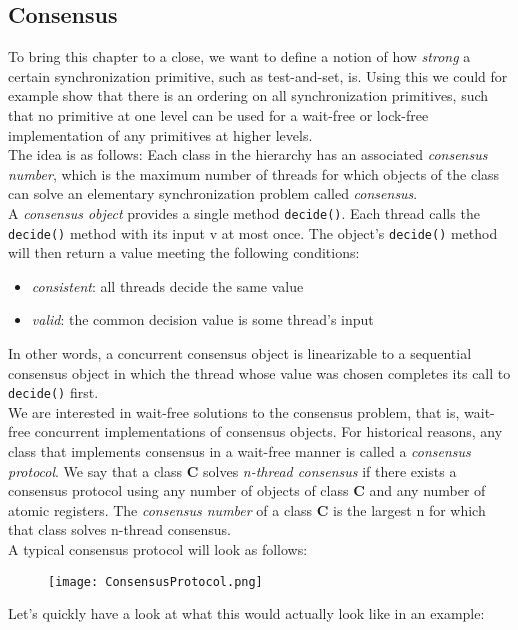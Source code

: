 \documentclass[main]{subfiles}
\begin{document}
\subsection{Consensus}
To bring this chapter to a close, we want to define a notion of how \textit{strong} a certain synchronization primitive, such as test-and-set, is. Using this we could for example show that there is an ordering on all synchronization primitives, such that no primitive at one level can be used for a wait-free or lock-free implementation of any primitives at higher levels. \\[3mm]
The idea is as follows: Each class in the hierarchy has an associated \textit{consensus number}, which is the maximum number of threads for which objects of the class can solve an elementary synchronization problem called \textit{consensus}. \\[3mm]
A \textit{consensus object} provides a single method \texttt{decide()}. Each thread calls the \texttt{decide()} method with its input v at most once. The object's \texttt{decide()} method will then return a value meeting the following conditions:
\begin{itemize}
    \item \textit{consistent}: all threads decide the same value
    \item \textit{valid}: the common decision value is some thread's input
\end{itemize}
In other words, a concurrent consensus object is linearizable to a sequential consensus object in which the thread whose value was chosen completes its call to  \texttt{decide()} first.\\[3mm]
We are interested in wait-free solutions to the consensus problem, that is, wait-free concurrent implementations of consensus objects. For historical reasons, any class that implements consensus in a wait-free manner is called a \textit{consensus protocol}. We say that a class \textbf{C} solves \textit{n-thread consensus} if there exists a consensus protocol using any number of objects of class \textbf{C} and any number of atomic registers. The \textit{consensus number} of a class \textbf{C} is the largest n for which that class solves n-thread consensus.\\[3mm]
A typical consensus protocol will look as follows:
\begin{figure}[H]
    \centering
    \texttt{[image: ConsensusProtocol.png]}
\end{figure}
Let's quickly have a look at what this would actually look like in an example:
\end{document}
